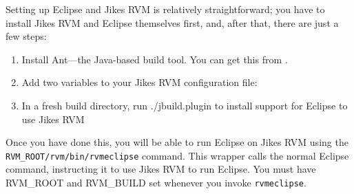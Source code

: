  Setting up Eclipse and Jikes RVM is relatively straightforward; you
have to install Jikes RVM and Eclipse themselves first, and, after
that, there are just a few steps:
\begin{enumerate}
\item Install Ant---the Java-based build tool.  You can get this from
\xlink{{\tt \antURL}}{\antURL}. 
\item Add two variables to your Jikes RVM configuration file:
\item In a fresh build directory, run ./jbuild.plugin to install
support for Eclipse to use Jikes RVM
\end{enumerate}

 Once you have done this, you will be able to run Eclipse on Jikes RVM
using the {\tt RVM\_ROOT/rvm/bin/rvmeclipse} command.  This wrapper
calls the normal Eclipse command, instructing it to use Jikes RVM to
run Eclipse.  You must have RVM\_ROOT and RVM\_BUILD set whenever you
invoke {\tt rvmeclipse}.
